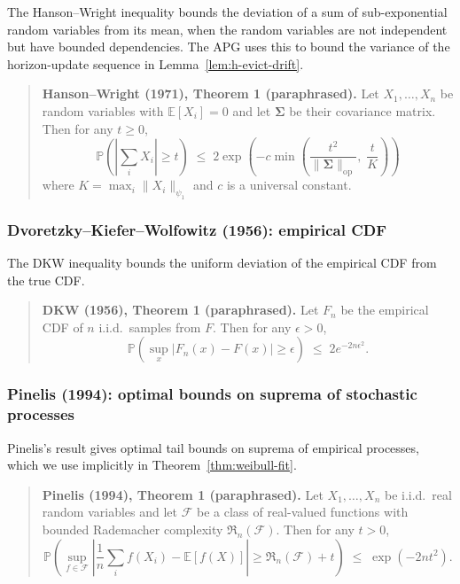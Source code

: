 The Hanson--Wright inequality bounds the deviation of a
sum of sub-exponential random variables from its mean,
when the random variables are not independent but have
bounded dependencies. The APG uses this to bound the
variance of the horizon-update sequence in
Lemma~\ref{lem:h-evict-drift}.

\begin{quote}
\textbf{Hanson--Wright (1971), Theorem 1 (paraphrased).} Let
$X_1, \ldots, X_n$ be random variables with
$\mathbb{E}[X_i] = 0$ and let
$\mathbf{\Sigma}$ be their covariance matrix. Then for any
$t \ge 0$,
\[
  \mathbb{P}\!\left( \left| \sum_i X_i \right| \ge t \right)
  \;\le\;
  2 \exp\!\left( -c \min\!\left( \frac{t^2}{\|\mathbf{\Sigma}\|_{\mathrm{op}}},\; \frac{t}{K} \right) \right)
\]
where $K = \max_i \|X_i\|_{\psi_1}$ and $c$ is a universal
constant.
\end{quote}

\subsubsection{Dvoretzky--Kiefer--Wolfowitz (1956): empirical CDF}

The DKW inequality bounds the uniform deviation of the
empirical CDF from the true CDF.

\begin{quote}
\textbf{DKW (1956), Theorem 1 (paraphrased).} Let
$F_n$ be the empirical CDF of $n$ i.i.d.\ samples from $F$.
Then for any $\epsilon > 0$,
\[
  \mathbb{P}\!\left( \sup_x |F_n(x) - F(x)| \ge \epsilon \right)
  \;\le\;
  2 e^{-2 n \epsilon^2}.
\]
\end{quote}

\subsubsection{Pinelis (1994): optimal bounds on suprema of stochastic processes}

Pinelis's result gives optimal tail bounds on suprema of
empirical processes, which we use implicitly in
Theorem~\ref{thm:weibull-fit}.

\begin{quote}
\textbf{Pinelis (1994), Theorem 1 (paraphrased).} Let
$X_1, \ldots, X_n$ be i.i.d.\ real random variables and let
$\mathcal{F}$ be a class of real-valued functions with
bounded Rademacher complexity $\mathfrak{R}_n(\mathcal{F})$.
Then for any $t > 0$,
\[
  \mathbb{P}\!\left( \sup_{f \in \mathcal{F}} \left|
  \frac{1}{n} \sum_i f(X_i) - \mathbb{E}[f(X)] \right| \ge
  \mathfrak{R}_n(\mathcal{F}) + t \right)
  \;\le\;
  \exp(-2 n t^2).
\]
\end{quote}

